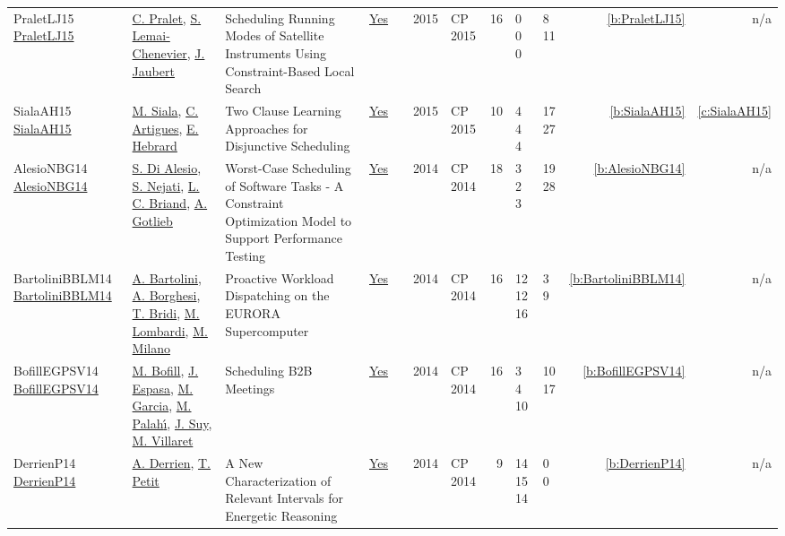 {\begin{longtable}{>{\raggedright\arraybackslash}p{3cm}>{\raggedright\arraybackslash}p{4.5cm}>{\raggedright\arraybackslash}p{6.0cm}rrrp{2.5cm}rp{1cm}p{1cm}rr}
PraletLJ15 \href{https://doi.org/10.1007/978-3-319-23219-5_48}{PraletLJ15} & \hyperref[auth:a21]{C. Pralet}, \hyperref[auth:a218]{S. Lemai-Chenevier}, \hyperref[auth:a219]{J. Jaubert} & Scheduling Running Modes of Satellite Instruments Using Constraint-Based Local Search & \href{../works/PraletLJ15.pdf}{Yes} & \cite{PraletLJ15} & 2015 & CP 2015 & 16 & 0 0 0 & 8 11 & \ref{b:PraletLJ15} & n/a\\
SialaAH15 \href{https://doi.org/10.1007/978-3-319-23219-5_28}{SialaAH15} & \hyperref[auth:a129]{M. Siala}, \hyperref[auth:a6]{C. Artigues}, \hyperref[auth:a1]{E. Hebrard} & \cellcolor{green!10}Two Clause Learning Approaches for Disjunctive Scheduling & \href{../works/SialaAH15.pdf}{Yes} & \cite{SialaAH15} & 2015 & CP 2015 & 10 & 4 4 4 & 17 27 & \ref{b:SialaAH15} & \ref{c:SialaAH15}\\
AlesioNBG14 \href{https://doi.org/10.1007/978-3-319-10428-7_58}{AlesioNBG14} & \hyperref[auth:a234]{S. {Di Alesio}}, \hyperref[auth:a235]{S. Nejati}, \hyperref[auth:a236]{L. C. Briand}, \hyperref[auth:a195]{A. Gotlieb} & Worst-Case Scheduling of Software Tasks - {A} Constraint Optimization Model to Support Performance Testing & \href{../works/AlesioNBG14.pdf}{Yes} & \cite{AlesioNBG14} & 2014 & CP 2014 & 18 & 3 2 3 & 19 28 & \ref{b:AlesioNBG14} & n/a\\
BartoliniBBLM14 \href{https://doi.org/10.1007/978-3-319-10428-7_55}{BartoliniBBLM14} & \hyperref[auth:a225]{A. Bartolini}, \hyperref[auth:a226]{A. Borghesi}, \hyperref[auth:a227]{T. Bridi}, \hyperref[auth:a142]{M. Lombardi}, \hyperref[auth:a143]{M. Milano} & Proactive Workload Dispatching on the {EURORA} Supercomputer & \href{../works/BartoliniBBLM14.pdf}{Yes} & \cite{BartoliniBBLM14} & 2014 & CP 2014 & 16 & 12 12 16 & 3 9 & \ref{b:BartoliniBBLM14} & n/a\\
BofillEGPSV14 \href{https://doi.org/10.1007/978-3-319-10428-7_56}{BofillEGPSV14} & \hyperref[auth:a228]{M. Bofill}, \hyperref[auth:a229]{J. Espasa}, \hyperref[auth:a230]{M. Garcia}, \hyperref[auth:a231]{M. Palah{\'{\i}}}, \hyperref[auth:a232]{J. Suy}, \hyperref[auth:a233]{M. Villaret} & Scheduling {B2B} Meetings & \href{../works/BofillEGPSV14.pdf}{Yes} & \cite{BofillEGPSV14} & 2014 & CP 2014 & 16 & 3 4 10 & 10 17 & \ref{b:BofillEGPSV14} & n/a\\
DerrienP14 \href{https://doi.org/10.1007/978-3-319-10428-7_22}{DerrienP14} & \hyperref[auth:a220]{A. Derrien}, \hyperref[auth:a221]{T. Petit} & \cellcolor{green!10}A New Characterization of Relevant Intervals for Energetic Reasoning & \href{../works/DerrienP14.pdf}{Yes} & \cite{DerrienP14} & 2014 & CP 2014 & 9 & 14 15 14 & 0 0 & \ref{b:DerrienP14} & n/a\\

\end{longtable}}
